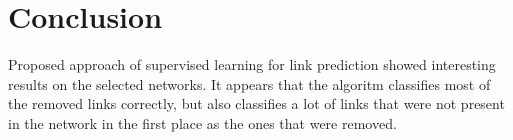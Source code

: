 \documentclass{llncs}
\begin{document}
\section{Conclusion}
%
Proposed approach of supervised learning for link prediction showed interesting results on the selected networks. It appears that the algoritm classifies most of the removed links correctly, but also classifies a lot of links that were not present in the network in the first place as the ones that were removed.
%
\\
\\
\\
%
%
\end{document}
